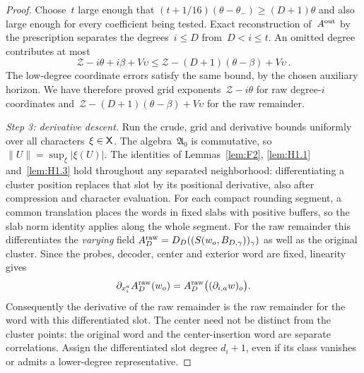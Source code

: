 \begin{proof}
Choose~$t$ large enough that $(t+1/16)(\theta-\theta_-)\ge(D+1)\theta$ and also large enough for every coefficient being tested. Exact reconstruction of~$A^{\rm out}$ by the prescription separates the degrees~$i\le D$ from~$D<i\le t$. An omitted degree contributes at most
\begin{equation*}
\mathcal Z-i\theta+i\beta+V\upsilon\le \mathcal Z-(D+1)(\theta-\beta)+V\upsilon\,.
\end{equation*}
The low-degree coordinate errors satisfy the same bound, by the chosen auxiliary horizon. We have therefore proved grid exponents~$\mathcal Z-i\theta$ for raw degree-$i$ coordinates and~$\mathcal Z-(D+1)(\theta-\beta)+V\upsilon$ for the raw remainder.

\emph{Step 3: derivative descent.} Run the crude, grid and derivative bounds uniformly over all characters~$\xi\in\mathsf{X}$. The algebra~$\mathfrak A_0$ is commutative, so $\|U\|=\sup_\xi|\xi(U)|$. The identities of Lemmas~\ref{lem:F2}, \ref{lem:H1.1} and~\ref{lem:H1.3} hold throughout any separated neighborhood: differentiating a cluster position replaces that slot by its positional derivative, also after compression and character evaluation. For each compact rounding segment, a common translation places the words in fixed slabs with positive buffers, so the slab norm identity applies along the whole segment. For the raw remainder this differentiates the \emph{varying} field $A_D^{\rm raw}=D_D((S(w_o,B_{D,\gamma}))_\gamma)$ as well as the original cluster. Since the probes, decoder, center and exterior word are fixed, linearity gives
\begin{equation*}
 \partial_{x_i^a}A_D^{\rm raw}(w_o)
 =A_D^{\rm raw}\bigl((\partial_{i,a}w)_o\bigr).
\end{equation*}
Consequently the derivative of the raw remainder is the raw remainder for the word with this differentiated slot. The center need not be distinct from the cluster points: the original word and the center-insertion word are separate correlations. Assign the differentiated slot degree $d_i+1$, even if its class vanishes or admits a lower-degree representative.


\end{proof}
